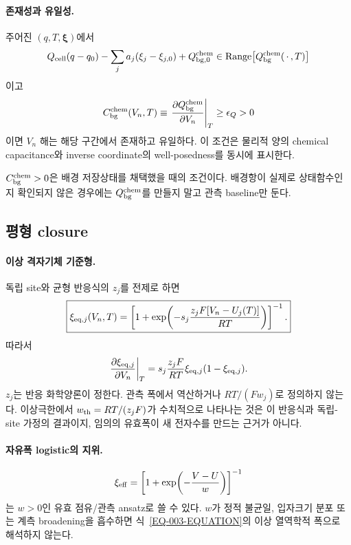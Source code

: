 \paragraph{ 존재성과 유일성.}
주어진 $(q,T,\bm\xi)$에서
\[
Q_{\mathrm{cell}}(q-q_0)-\sum_j a_j(\xi_j-\xi_{j,0})+Q_{\mathrm{bg},0}^{\mathrm{chem}}
\in {\rm Range}\big[Q_{\mathrm{bg}}^{\mathrm{chem}}(\,\cdot\,,T)\big]
\]
이고
\[
C_{\mathrm{bg}}^{\mathrm{chem}}(V_n,T)
\equiv\left.\frac{\partial Q_{\mathrm{bg}}^{\mathrm{chem}}}{\partial V_n}\right|_T
\ge \epsilon_Q>0
\]
이면 $V_n$ 해는 해당 구간에서 존재하고 유일하다. 이 조건은
물리적 양의 chemical capacitance와 inverse coordinate의
well-posedness를 동시에 표시한다.

\begin{validity}
$C_{\mathrm{bg}}^{\mathrm{chem}}>0$은 배경 저장상태를 채택했을 때의 조건이다.
배경항이 실제로 상태함수인지 확인되지 않은 경우에는
$Q_{\mathrm{bg}}^{\mathrm{chem}}$를 만들지 말고 관측 baseline만 둔다.
\end{validity}

\subsection{평형 closure}\label{EQ-CH1-CLOSURE}

\paragraph{ 이상 격자기체 기준형.}
독립 site와 균형 반응식의 $z_j$를 전제로 하면
\begin{equation}
\boxed{
\xi_{\mathrm{eq},j}(V_n,T)
=\left[
1+\exp\!\left(
-s_j\frac{z_jF[V_n-U_j(T)]}{RT}
\right)
\right]^{-1}.
}
\label{EQ-003-EQUATION}
\end{equation}
따라서
\begin{equation}
\left.\frac{\partial\xi_{\mathrm{eq},j}}{\partial V_n}\right|_T
=s_j\frac{z_jF}{RT}\xi_{\mathrm{eq},j}(1-\xi_{\mathrm{eq},j}).
\label{EQ-003-DERIVATIVE}
\end{equation}
$z_j$는 반응 화학양론이 정한다. 관측 폭에서 역산하거나
$RT/(Fw_j)$로 정의하지 않는다. 이상극한에서
$w_{\rm th}=RT/(z_jF)$가 수치적으로 나타나는 것은 이 반응식과
독립-site 가정의 결과이지, 임의의 유효폭이 새 전자수를 만드는
근거가 아니다.

\paragraph{ 자유폭 logistic의 지위.}
\[
\xi_{\rm eff}
=\left[1+\exp\!\left(-\frac{V-U}{w}\right)\right]^{-1}
\]
는 $w>0$인 유효 점유/관측 ansatz로 쓸 수 있다. $w$가 정적
불균일, 입자크기 분포 또는 계측 broadening을 흡수하면
식~\eqref{EQ-003-EQUATION}의 이상 열역학적 폭으로 해석하지 않는다.


